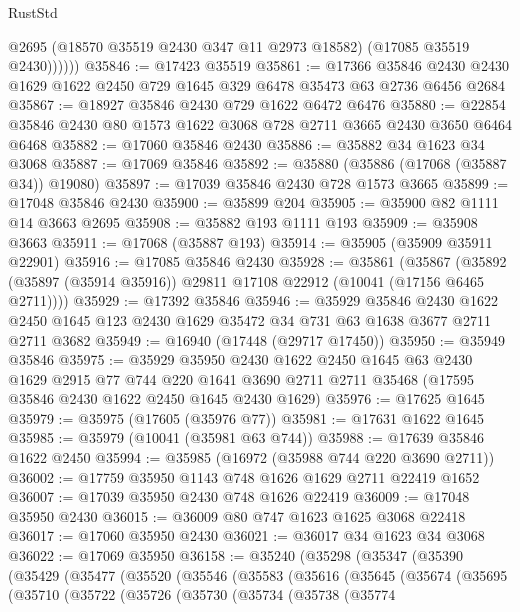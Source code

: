 \begin{lexlean}{RustStd}
\begin{coremodule}
              @2695
              (@18570 @35519 @2430 @347 @11 @2973 @18582)
              (@17085 @35519 @2430))))))
@35846 := @17423 @35519
@35861 := @17366
    @35846
    @2430
    @2430
    @1629
    @1622
    @2450
    @729
    @1645
    @329
    @6478
    @35473
    @63
    @2736
    @6456
    @2684
@35867 := @18927 @35846 @2430 @729 @1622 @6472 @6476
@35880 := @22854 @35846 @2430 @80 @1573 @1622 @3068 @728 @2711 @3665 @2430 @3650 @6464 @6468
@35882 := @17060 @35846 @2430
@35886 := @35882 @34 @1623 @34 @3068
@35887 := @17069 @35846
@35892 := @35880 (@35886 (@17068 (@35887 @34)) @19080)
@35897 := @17039 @35846 @2430 @728 @1573 @3665
@35899 := @17048 @35846 @2430
@35900 := @35899 @204
@35905 := @35900 @82 @1111 @14 @3663 @2695
@35908 := @35882 @193 @1111 @193
@35909 := @35908 @3663
@35911 := @17068 (@35887 @193)
@35914 := @35905 (@35909 @35911 @22901)
@35916 := @17085 @35846 @2430
@35928 := @35861
    (@35867 (@35892 (@35897 (@35914 @35916)) @29811 @17108 @22912 (@10041 (@17156 @6465 @2711))))
@35929 := @17392 @35846
@35946 := @35929
    @35846
    @2430
    @1622
    @2450
    @1645
    @123
    @2430
    @1629
    @35472
    @34
    @731
    @63
    @1638
    @3677
    @2711
    @2711
    @3682
@35949 := @16940 (@17448 (@29717 @17450))
@35950 := @35949 @35846
@35975 := @35929
    @35950
    @2430
    @1622
    @2450
    @1645
    @63
    @2430
    @1629
    @2915
    @77
    @744
    @220
    @1641
    @3690
    @2711
    @2711
    @35468
    (@17595 @35846 @2430 @1622 @2450 @1645 @2430 @1629)
@35976 := @17625 @1645
@35979 := @35975 (@17605 (@35976 @77))
@35981 := @17631 @1622 @1645
@35985 := @35979 (@10041 (@35981 @63 @744))
@35988 := @17639 @35846 @1622 @2450
@35994 := @35985 (@16972 (@35988 @744 @220 @3690 @2711))
@36002 := @17759 @35950 @1143 @748 @1626 @1629 @2711 @22419 @1652
@36007 := @17039 @35950 @2430 @748 @1626 @22419
@36009 := @17048 @35950 @2430
@36015 := @36009 @80 @747 @1623 @1625 @3068 @22418
@36017 := @17060 @35950 @2430
@36021 := @36017 @34 @1623 @34 @3068
@36022 := @17069 @35950
@36158 := @35240
    (@35298
      (@35347
        (@35390
          (@35429
            (@35477
              (@35520
                (@35546
                  (@35583
                    (@35616
                      (@35645
                        (@35674
                          (@35695
                            (@35710
                              (@35722
                                (@35726
                                  (@35730
                                    (@35734
                                      (@35738
                                        (@35774

\end{coremodule}
\end{lexlean}
